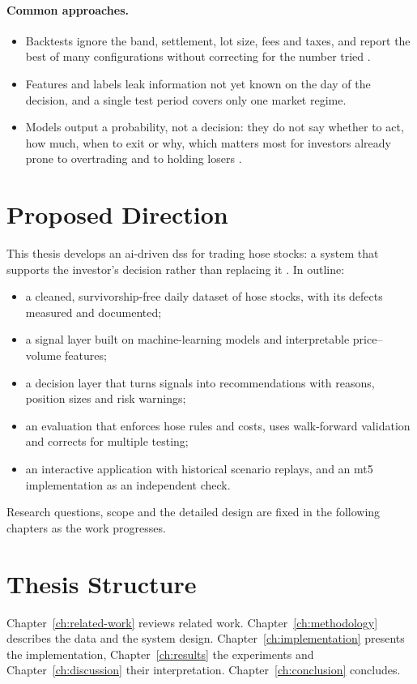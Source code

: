 \paragraph{Common approaches.}
\begin{itemize}
  \item Backtests ignore the band, settlement, lot size, fees and taxes, and report the best of
    many configurations without correcting for the number tried
    \citep{harvey2016cross,bailey2014dsr,bailey2017pbo}.
  \item Features and labels leak information not yet known on the day of the decision, and a
    single test period covers only one market regime.
  \item Models output a probability, not a decision: they do not say whether to act, how much,
    when to exit or why, which matters most for investors already prone to overtrading and to
    holding losers \citep{barber2000trading,shefrin1985disposition}.
\end{itemize}

\section{Proposed Direction}

This thesis develops an \gls{ai}-driven \gls{dss} for trading \gls{hose} stocks: a system that
supports the investor's decision rather than replacing it \citep{power2002dss}. In outline:

\begin{itemize}
  \item a cleaned, survivorship-free daily dataset of \gls{hose} stocks, with its defects
    measured and documented;
  \item a signal layer built on machine-learning models and interpretable price--volume
    features;
  \item a decision layer that turns signals into recommendations with reasons, position sizes
    and risk warnings;
  \item an evaluation that enforces \gls{hose} rules and costs, uses walk-forward validation
    and corrects for multiple testing;
  \item an interactive application with historical scenario replays, and an \gls{mt5}
    implementation as an independent check.
\end{itemize}

Research questions, scope and the detailed design are fixed in the following chapters as the
work progresses.

\section{Thesis Structure}

Chapter~\ref{ch:related-work} reviews related work. Chapter~\ref{ch:methodology} describes the
data and the system design. Chapter~\ref{ch:implementation} presents the implementation,
Chapter~\ref{ch:results} the experiments and Chapter~\ref{ch:discussion} their interpretation.
Chapter~\ref{ch:conclusion} concludes.
